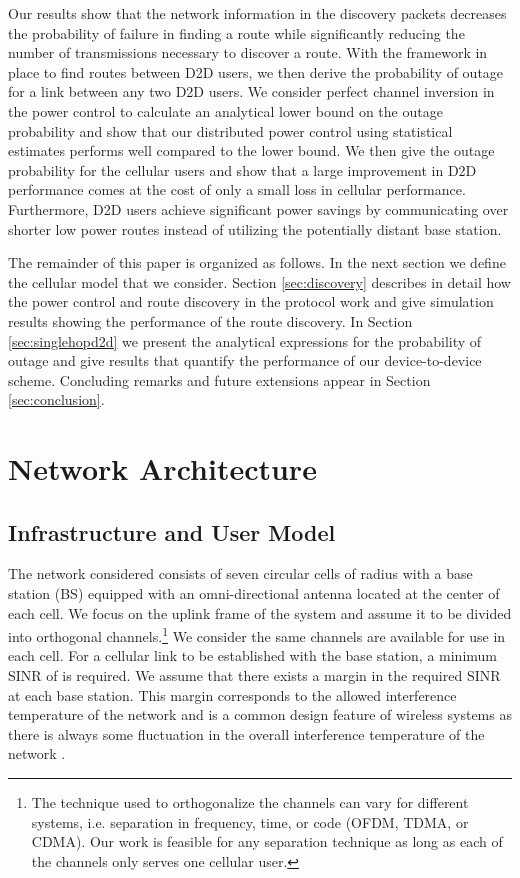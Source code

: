 \documentclass[10pt, final, journal, letterpaper,oneside, twocolumn]{IEEEtran}
\begin{document}
Our results show that the network information in the discovery packets decreases the probability of failure in finding a route while significantly reducing the number of transmissions necessary to discover a route.  With the framework in place to find routes between D2D users, we then derive the probability of outage for a link between any two D2D users.  We consider perfect channel inversion in the power control to calculate an analytical lower bound on the outage probability and show that our distributed power control using statistical estimates performs well compared to the lower bound.  We then give the outage probability for the cellular users and show that a large improvement in D2D performance comes at the cost of only a small loss in cellular performance.  Furthermore, D2D users achieve significant power savings by communicating over shorter low power routes instead of utilizing the potentially distant base station.  


The remainder of this paper is organized as follows.  In the next section we define the cellular model that we consider.  Section \ref{sec:discovery} describes in detail how the power control and route discovery in the protocol work and give simulation results showing the performance of the route discovery.  In Section \ref{sec:singlehopd2d} we present the analytical expressions for the probability of outage and give results that quantify the performance of our device-to-device scheme.  Concluding remarks and future extensions appear in Section \ref{sec:conclusion}.  








\section{Network Architecture}
\label{networkmodel}
\subsection{Infrastructure and User Model}
The network considered consists of seven circular cells of radius  with a base station (BS) equipped with an omni-directional antenna located at the center of each cell.  We focus on the uplink frame of the system and assume it to be divided into  orthogonal channels.\footnote{The technique used to orthogonalize the   channels can vary for different systems, i.e. separation in frequency, time, or code (OFDM, TDMA, or CDMA). Our work is feasible for any separation technique as long as each of the  channels only serves one cellular user.  } We consider the same  channels are available for use in each cell.  For a cellular link to be established with the base station, a minimum SINR of  is required.  We assume that there exists a margin  in the required SINR at each base station.  This margin corresponds to the allowed interference temperature of the network and is a common design feature of wireless systems as there is always some fluctuation in the overall interference temperature of the network \cite{Martin-Sacristan2009On-the-Way-Towa}.  
\end{document}
